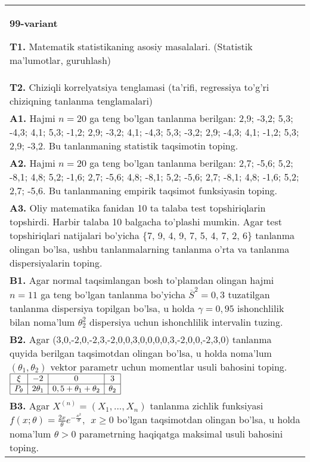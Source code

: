 \documentclass{article}
\begin{document}
\begin{tabular}{m{17cm}}
\textbf{99-variant}
\newline

\textbf{T1.} Matematik statistikaning asosiy masalalari. (Statistik ma'lumotlar, guruhlash)
\\
\textbf{T2.} 
Chiziqli korrelyatsiya tenglamasi (ta'rifi, regressiya to'g'ri chiziqning tanlanma tenglamalari)
\\
\textbf{A1.} 
Hajmi \(n = 20\) ga teng bo'lgan tanlanma berilgan: 2,9; -3,2; 5,3; -4,3; 4,1; 5,3; -1,2; 2,9; -3,2; 4,1; -4,3; 5,3; -3,2; 2,9; -4,3; 4,1; -1,2; 5,3; 2,9; -3,2. Bu tanlanmaning statistik taqsimotin toping.
\\
\textbf{A2.} 
Hajmi \(n = 20\) ga teng bo'lgan tanlanma berilgan: 2,7; -5,6; 5,2; -8,1; 4,8; 5,2; -1,6; 2,7; -5,6; 4,8; -8,1; 5,2; -5,6; 2,7; -8,1; 4,8; -1,6; 5,2; 2,7; -5,6. Bu tanlanmaning empirik taqsimot funksiyasin toping.
\\
\textbf{A3.} 
Oliy matematika fanidan 10 ta talaba test topshiriqlarin topshirdi. Harbir talaba 10 balgacha to'plashi mumkin. Agar test topshiriqlari natijalari bo'yicha \{7, 9, 4, 9, 7, 5, 4, 7, 2, 6\} tanlanma olingan bo'lsa, ushbu tanlanmalarning tanlanma o'rta va tanlanma dispersiyalarin toping.
\\
\textbf{B1.} 
Agar normal taqsimlangan bosh to'plamdan olingan hajmi \(n = 11\) ga teng bo'lgan tanlanma bo'yicha \({\overline{S}}^{2} = 0,3\) tuzatilgan tanlanma dispersiya topilgan bo'lsa, u holda \(\gamma = 0,95\) ishonchlilik bilan noma'lum \(\theta_{2}^{2}\) dispersiya uchun ishonchlilik intervalin tuzing.
\\
\textbf{B2.} 
Agar (3,0,-2,0,-2,3,-2,0,0,3,0,0,0,0,3,-2,0,0,-2,3,0) tanlanma quyida berilgan taqsimotdan olingan bo'lsa, u holda noma'lum \(\left( \theta_{1},\theta_{2} \right)\) vektor parametr uchun momentlar usuli bahosini toping.
$\begin{array}{|c|c|c|c|}
    \hline
    \xi & - 2 & 0 & 3 \\
    \hline
    P_{\theta} & 2\theta_{1} & 0,5 + \theta_{1} + \theta_{2} & \theta_{2} \\
    \hline
\end{array}$
\\
\textbf{B3.} 
Agar \(X^{(n)} = \left( X_{1},...,X_{n} \right)\) tanlanma zichlik funksiyasi \(f(x;\theta) = \frac{2x}{\theta}e^{- \frac{x^{2}}{\theta}},\ \ x \geq 0\) bo'lgan taqsimotdan olingan bo'lsa, u holda noma'lum \(\theta > 0\) parametrning haqiqatga maksimal usuli bahosini toping.
\\

\end{tabular}
\end{document}
